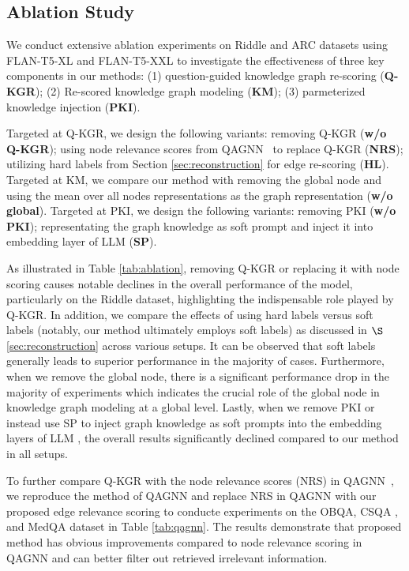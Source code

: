 \documentclass[11pt]{article}
\begin{document}
\subsection{Ablation Study}
We conduct extensive ablation experiments on Riddle and ARC datasets using FLAN-T5-XL and FLAN-T5-XXL to  investigate the effectiveness of three key components in our methods: 
(1) question-guided knowledge graph re-scoring (\textbf{Q-KGR});
(2) Re-scored  knowledge graph modeling (\textbf{KM});
(3) parmeterized knowledge injection (\textbf{PKI}). 

Targeted at Q-KGR, we design the following variants: 
removing Q-KGR (\textbf{w/o Q-KGR}); 
using node relevance scores from QAGNN~\cite{qagnn} to replace Q-KGR (\textbf{NRS});
utilizing hard labels from Section \ref{sec:reconstruction} for edge re-scoring (\textbf{HL}).
Targeted at KM, we compare our method with removing the global node and using the mean over all nodes representations as the graph representation (\textbf{w/o global}).
Targeted at PKI, we design the following variants: removing PKI (\textbf{w/o PKI});
representating the graph knowledge as soft prompt \cite{gnp} and inject it into embedding layer of LLM (\textbf{SP}). 

As illustrated in Table \ref{tab:ablation}, removing Q-KGR or replacing it with node scoring causes notable declines in the overall performance of the model, particularly on the Riddle dataset, highlighting the indispensable role played by Q-KGR. 
In addition, we compare the effects of using hard labels versus soft labels (notably, our method ultimately employs soft labels) as discussed in $\S$ \ref{sec:reconstruction} across various setups. 
It can be observed that soft labels generally leads to superior performance in the majority of cases.
Furthermore, when we remove the global node, there is a significant performance drop in the majority of experiments which indicates the crucial role of the global node in knowledge graph modeling at a global level.
Lastly, when we remove PKI or instead use SP to inject graph knowledge as soft prompts into the embedding layers of LLM \cite{gnp}, the overall results significantly declined compared to our method in all setups. 

To further compare Q-KGR with the node relevance scores (NRS) in QAGNN~\cite{qagnn}, we reproduce the method of QAGNN and replace NRS in QAGNN with our proposed edge relevance scoring to conducte experiments on the OBQA, CSQA \cite{kagnet}, and MedQA \cite{medqa} dataset in Table \ref{tab:qagnn}.
The results demonstrate that proposed method has obvious improvements compared to node relevance scoring in QAGNN and can better filter out retrieved irrelevant information.
\end{document}
